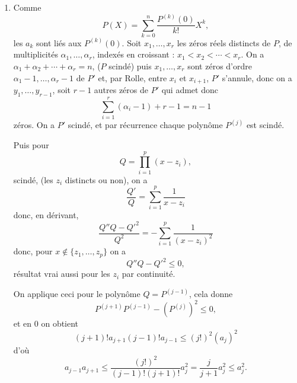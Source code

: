 \begin{enumerate}[label=\arabic*.,leftmargin=2.2em,itemsep=1.1em]
Comme $a_q\overline{P(z_0)}\ne0$, posons
\[
a_q\overline{P(z_0)}=Ae^{i\alpha}
\]
avec $A>0$, et soit $h=\rho e^{i\theta}$, on a
\[
|P(z_0+\rho e^{i\theta})|^2=|P(z_0)|^2+\rho^qA\left(e^{i(q\theta+\alpha)}+e^{-i(q\theta+\alpha)}+o(1)\right).
\]

Avoir $|P(z_0+\rho e^{i\theta})|=|P(z_0)|$ équivaut, (pour $\rho\ne0$) à avoir $\theta$ tel que
\[
\rho^qA\left(e^{i(q\theta+\alpha)}+e^{-i(q\theta+\alpha)}+o(1)\right)=0.
\]

Soit
\[
\varphi(\theta)=2\cos(q\theta+\alpha)+o(1),
\]
soit $\varepsilon\in]0,1[$ fixé, il existe $\eta>0$ tel que
\[
\rho=|h|\in]0,\eta[\Rightarrow |o(1)|<\varepsilon<1.
\]
Mais alors comme
\[
\cos\left(q\cdot\frac{2k\pi-\alpha}{q}+\alpha\right)=\cos2k\pi=1
\]
et
\[
\cos\left(q\cdot\frac{2k\pi+\pi-\alpha}{q}+\alpha\right)=\cos(2k+1)\pi=-1,
\]
on a
\[
\varphi\left(\frac{2k\pi-\alpha}{q}\right)>0
\]
et
\[
\varphi\left(\frac{2k\pi+\pi-\alpha}{q}\right)<0,
\]
la fonction $\varphi$ s'annule sur les intervalles
\[
\left]\frac{n\pi-\alpha}{q},\frac{n\pi+\pi-\alpha}{q}\right[,
\]
ceci pour $0\le n<2q$ : on a $2q$ intervalles de ce type dans
\[
\left[-\frac\alpha q,2\pi-\frac\alpha q\right]
\]
d'où $2q\ge4$ éléments $z=z_0+h$ avec $|h|=\rho$ tels que $|P(z)|=|P(z_0)|$ et ce pour tout $\rho\in]0,\eta[$.

\item Comme
\[
P(X)=\sum_{k=0}^n\frac{P^{(k)}(0)}{k!}X^k,
\]
les $a_k$ sont liés aux $P^{(k)}(0)$. Soit $x_1,\ldots,x_r$ les zéros réels distincts de $P$, de multiplicités $\alpha_1,\ldots,\alpha_r$, indexés en croissant : $x_1<x_2<\cdots<x_r$. On a $\alpha_1+\alpha_2+\cdots+\alpha_r=n$, ($P$ scindé) puis $x_1,\ldots,x_r$ sont zéros d'ordre $\alpha_1-1,\ldots,\alpha_r-1$ de $P'$ et, par Rolle, entre $x_i$ et $x_{i+1}$, $P'$ s'annule, donc on a $y_1,\ldots,y_{r-1}$, soit $r-1$ autres zéros de $P'$ qui admet donc
\[
\sum_{i=1}^r(\alpha_i-1)+r-1=n-1
\]
zéros. On a $P'$ scindé, et par récurrence chaque polynôme $P^{(j)}$ est scindé.

Puis pour
\[
Q=\prod_{i=1}^p(x-z_i),
\]
scindé, (les $z_i$ distincts ou non), on a
\[
\frac{Q'}Q=\sum_{i=1}^p\frac1{x-z_i}
\]
donc, en dérivant,
\[
\frac{Q''Q-Q'^2}{Q^2}=-\sum_{i=1}^p\frac1{(x-z_i)^2}
\]
donc, pour $x\notin\{z_1,\ldots,z_p\}$ on a
\[
Q''Q-Q'^2\le0,
\]
résultat vrai aussi pour les $z_i$ par continuité.

On applique ceci pour le polynôme $Q=P^{(j-1)}$, cela donne
\[
P^{(j+1)}P^{(j-1)}-(P^{(j)})^2\le0,
\]
et en 0 on obtient
\[
(j+1)!a_{j+1}(j-1)!a_{j-1}\le(j!)^2(a_j)^2
\]
d'où
\[
a_{j-1}a_{j+1}\le\frac{(j!)^2}{(j-1)!(j+1)!}a_j^2
=\frac{j}{j+1}a_j^2\le a_j^2.
\]


\end{enumerate}
